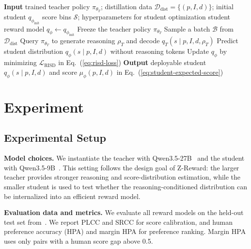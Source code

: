 \documentclass{article}
\newcommand{\mname}{Z-Reward\xspace}
\newcommand{\stuname}{RISD\xspace}
\begin{document}
\begin{algorithm}[t]
  \caption{Reasoning-Internalized Score Distillation (\stuname)}
  \label{alg:risd}
  \begin{algorithmic}[1]
    \Statex \textbf{Input} trained teacher policy $\pi_{\theta_T}$; distillation data $\mathcal{D}_{\mathrm{dist}}=\{(p,I,d)\}$; initial student $q_{\phi_{\mathrm{init}}}$
    \Statex \hspace{\algorithmicindent} score bins $\mathcal{S}$; hyperparameters for student optimization
    \State student reward model $q_\phi \gets q_{\phi_{\mathrm{init}}}$
    \State Freeze the teacher policy $\pi_{\theta_T}$
      \State Sample a batch $\mathcal{B}$ from $\mathcal{D}_{\mathrm{dist}}$
        \State Query $\pi_{\theta_T}$ to generate reasoning $\rho_T$ and decode $q_T(s\mid p,I,d,\rho_T)$
        \State Predict student distribution $q_\phi(s\mid p,I,d)$ without reasoning tokens
      \EndFor
      \State Update $q_\phi$ by minimizing $\mathcal{L}_{\mathrm{RISD}}$ in Eq.~(\ref{eq:risd-loss})
    \EndFor
    \Statex \textbf{Output} deployable student $q_\phi(s\mid p,I,d)$ and score $\mu_\phi(p,I,d)$ in Eq.~(\ref{eq:student-expected-score})
  \end{algorithmic}
\end{algorithm}


\section{Experiment}

\subsection{Experimental Setup}

\textbf{Model choices.} We instantiate the teacher with Qwen3.5-27B~\cite{qwen3.5} and the student with Qwen3.5-9B~\cite{qwen3.5}. This setting follows the design goal of \mname: the larger teacher provides stronger reasoning and score-distribution estimation, while the smaller student is used to test whether the reasoning-conditioned distribution can be internalized into an efficient reward model.




\textbf{Evaluation data and metrics.} We evaluate all reward models on the held-out test set from~. We report PLCC and SRCC for score calibration, and human preference accuracy (HPA) and margin HPA for preference ranking. Margin HPA uses only pairs with a human score gap above 0.5.
\end{document}
